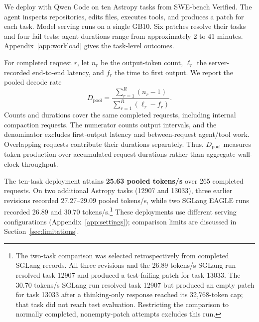 We deploy \sys{} with Qwen Code on ten Astropy tasks from SWE-bench Verified. The agent inspects repositories, edits files, executes tools, and produces a patch for each task. Model serving runs on a single GB10. Six patches resolve their tasks and four fail tests; agent durations range from approximately 2 to 41 minutes. Appendix~\ref{app:workload} gives the task-level outcomes.

For completed request $r$, let $n_r$ be the output-token count, $\ell_r$ the server-recorded end-to-end latency, and $f_r$ the time to first output. We report the pooled decode rate
\begin{equation}
 D_{\mathrm{pool}} =
 \frac{\sum_{r=1}^{R}(n_r-1)}{\sum_{r=1}^{R}(\ell_r-f_r)}.
 \label{eq:pooled-decode}
\end{equation}
Counts and durations cover the same completed requests, including internal compaction requests. The numerator counts output intervals, and the denominator excludes first-output latency and between-request agent/tool work. Overlapping requests contribute their durations separately. Thus, $D_{\mathrm{pool}}$ measures token production over accumulated request durations rather than aggregate wall-clock throughput.

The ten-task deployment attains \textbf{25.63 pooled tokens/s} over 265 completed requests. On two additional Astropy tasks (12907 and 13033), three earlier \sys{} revisions recorded 27.27--29.09 pooled tokens/s, while two SGLang EAGLE runs recorded 26.89 and 30.70 tokens/s.\footnote{The two-task comparison was selected retrospectively from completed SGLang records. All three \sys{} revisions and the 26.89 tokens/s SGLang run resolved task 12907 and produced a test-failing patch for task 13033. The 30.70 tokens/s SGLang run resolved task 12907 but produced an empty patch for task 13033 after a thinking-only response reached its 32,768-token cap; that task did not reach test evaluation. Restricting the comparison to normally completed, nonempty-patch attempts excludes this run.} These deployments use different serving configurations (Appendix~\ref{app:settings}); comparison limits are discussed in Section~\ref{sec:limitations}.
